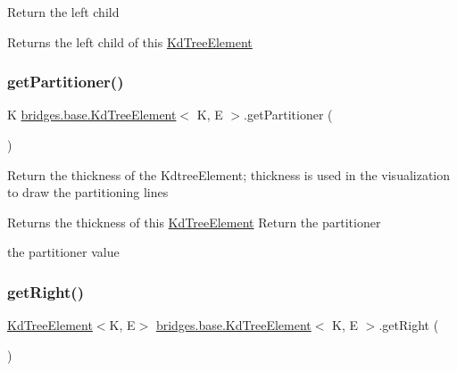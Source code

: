 Return the left child

\begin{DoxyReturn}{Returns}
the left child of this \hyperlink{classbridges_1_1base_1_1_kd_tree_element}{Kd\+Tree\+Element} 
\end{DoxyReturn}
\mbox{\label{classbridges_1_1base_1_1_kd_tree_element_a56864f8bc411dd4bfd624fb322b0640b}} 
\subsubsection{\texorpdfstring{get\+Partitioner()}{getPartitioner()}}
{\footnotesize\ttfamily K \hyperlink{classbridges_1_1base_1_1_kd_tree_element}{bridges.\+base.\+Kd\+Tree\+Element}$<$ K, E $>$.get\+Partitioner (\begin{DoxyParamCaption}{ }\end{DoxyParamCaption})}

Return the thickness of the Kdtree\+Element; thickness is used in the visualization to draw the partitioning lines

\begin{DoxyReturn}{Returns}
the thickness of this \hyperlink{classbridges_1_1base_1_1_kd_tree_element}{Kd\+Tree\+Element} Return the partitioner

the partitioner value 
\end{DoxyReturn}
\mbox{\label{classbridges_1_1base_1_1_kd_tree_element_a990694a36d44aba5f844f1752692c8e6}} 
\subsubsection{\texorpdfstring{get\+Right()}{getRight()}}
{\footnotesize\ttfamily \hyperlink{classbridges_1_1base_1_1_kd_tree_element}{Kd\+Tree\+Element}$<$K, E$>$ \hyperlink{classbridges_1_1base_1_1_kd_tree_element}{bridges.\+base.\+Kd\+Tree\+Element}$<$ K, E $>$.get\+Right (\begin{DoxyParamCaption}{ }\end{DoxyParamCaption})}

